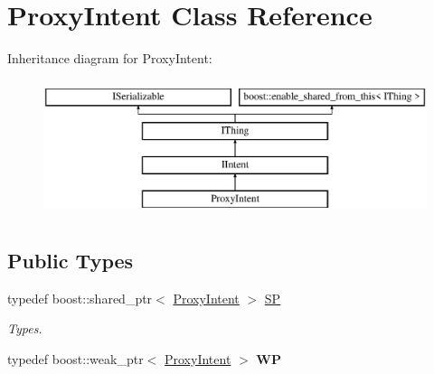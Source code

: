 \hypertarget{class_proxy_intent}{}\section{Proxy\+Intent Class Reference}
\label{class_proxy_intent}
Inheritance diagram for Proxy\+Intent\+:\begin{figure}[H]
\begin{center}
\leavevmode
\includegraphics[height=4.000000cm]{class_proxy_intent}
\end{center}
\end{figure}
\subsection*{Public Types}
\begin{DoxyCompactItemize}
\item 
\mbox{\label{class_proxy_intent_ab2407cf9af3d6104709d4f1e01ded585}} 
typedef boost\+::shared\+\_\+ptr$<$ \hyperlink{class_proxy_intent}{Proxy\+Intent} $>$ \hyperlink{class_proxy_intent_ab2407cf9af3d6104709d4f1e01ded585}{SP}
\begin{DoxyCompactList}\small\item\em Types. \end{DoxyCompactList}\item 
\mbox{\label{class_proxy_intent_aab8f16ec1f737745c3899a172ec138af}} 
typedef boost\+::weak\+\_\+ptr$<$ \hyperlink{class_proxy_intent}{Proxy\+Intent} $>$ {\bfseries WP}
\end{DoxyCompactItemize}

